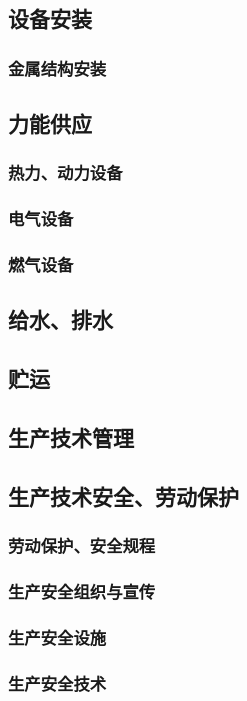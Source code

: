 \documentclass[UTF8]{../../ApplicationUniverse}
\begin{document}
    \subsection{设备安装}
        \subsubsection{金属结构安装}
    \subsection{力能供应}
        \subsubsection{热力、动力设备}
        \subsubsection{电气设备}
        \subsubsection{燃气设备}
    \subsection{给水、排水}
    \subsection{贮运}
    \subsection{生产技术管理}
    \subsection{生产技术安全、劳动保护}
        \subsubsection{劳动保护、安全规程}
        \subsubsection{生产安全组织与宣传}
        \subsubsection{生产安全设施}
        \subsubsection{生产安全技术}
\end{document}
